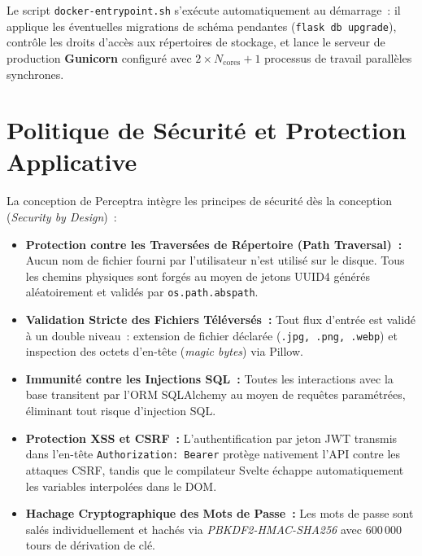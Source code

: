 Le script \texttt{docker-entrypoint.sh} s'exécute automatiquement au démarrage~: il applique les éventuelles migrations de schéma pendantes (\texttt{flask db upgrade}), contrôle les droits d'accès aux répertoires de stockage, et lance le serveur de production \textbf{Gunicorn} configuré avec $2 \times N_{\text{cores}} + 1$ processus de travail parallèles synchrones.

\section{Politique de Sécurité et Protection Applicative}

La conception de Perceptra intègre les principes de sécurité dès la conception (\textit{Security by Design})~:
\begin{itemize}
    \item \textbf{Protection contre les Traversées de Répertoire (Path Traversal)~:} Aucun nom de fichier fourni par l'utilisateur n'est utilisé sur le disque. Tous les chemins physiques sont forgés au moyen de jetons UUID4 générés aléatoirement et validés par \texttt{os.path.abspath}.
    \item \textbf{Validation Stricte des Fichiers Téléversés~:} Tout flux d'entrée est validé à un double niveau~: extension de fichier déclarée (\texttt{.jpg, .png, .webp}) et inspection des octets d'en-tête (\textit{magic bytes}) via Pillow.
    \item \textbf{Immunité contre les Injections SQL~:} Toutes les interactions avec la base transitent par l'ORM SQLAlchemy au moyen de requêtes paramétrées, éliminant tout risque d'injection SQL.
    \item \textbf{Protection XSS et CSRF~:} L'authentification par jeton JWT transmis dans l'en-tête \texttt{Authorization: Bearer} protège nativement l'API contre les attaques CSRF, tandis que le compilateur Svelte échappe automatiquement les variables interpolées dans le DOM.
    \item \textbf{Hachage Cryptographique des Mots de Passe~:} Les mots de passe sont salés individuellement et hachés via \textit{PBKDF2-HMAC-SHA256} avec 600\,000 tours de dérivation de clé.
\end{itemize}
